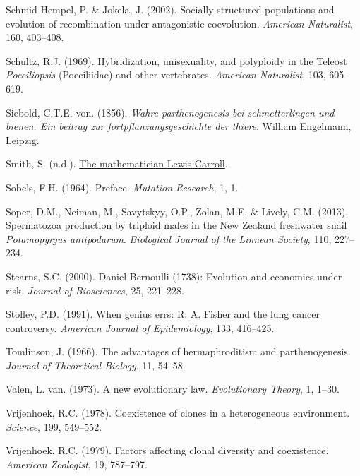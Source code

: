 \documentclass[
  letterpaper,
]{book}
\newlength{\cslhangindent}
\newenvironment{CSLReferences}[2] %
 {\begin{list}{}{%
  \setlength{\itemindent}{0pt}
  \setlength{\leftmargin}{0pt}
  \setlength{\parsep}{0pt}
  \ifodd #1
   \setlength{\leftmargin}{\cslhangindent}
   \setlength{\itemindent}{-1\cslhangindent}
  \fi
  \setlength{\itemsep}{#2\baselineskip}}}
 {\end{list}}
\begin{document}
\begin{CSLReferences}{1}{0}
Schmid-Hempel, P. \& Jokela, J. (2002). Socially structured populations
and evolution of recombination under antagonistic coevolution.
\emph{American Naturalist}, 160, 403--408.

Schultz, R.J. (1969). Hybridization, unisexuality, and polyploidy in the
{Teleost} \emph{{P}oeciliopsis} ({Poeciliidae}) and other vertebrates.
\emph{American Naturalist}, 103, 605--619.

Siebold, C.T.E. von. (1856). \emph{Wahre parthenogenesis bei
schmetterlingen und bienen. Ein beitrag zur fortpflanzungsgeschichte der
thiere}. William Engelmann, Leipzig.

Smith, S. (n.d.).
\href{http://www.herkimershideaway.org/writings/carroll.htm}{The
mathematician {Lewis Carroll}}.

Sobels, F.H. (1964). Preface. \emph{Mutation Research}, 1, 1.

Soper, D.M., Neiman, M., Savytskyy, O.P., Zolan, M.E. \& Lively, C.M.
(2013). Spermatozoa production by triploid males in the {New Zealand}
freshwater snail \emph{{P}otamopyrgus antipodarum}. \emph{Biological
Journal of the Linnean Society}, 110, 227--234.

Stearns, S.C. (2000). {Daniel Bernoulli} (1738): Evolution and economics
under risk. \emph{Journal of Biosciences}, 25, 221--228.

Stolley, P.D. (1991). When genius errs: R. A. Fisher and the lung cancer
controversy. \emph{American Journal of Epidemiology}, 133, 416--425.

Tomlinson, J. (1966). The advantages of hermaphroditism and
parthenogenesis. \emph{Journal of Theoretical Biology}, 11, 54--58.

Valen, L. van. (1973). A new evolutionary law. \emph{Evolutionary
Theory}, 1, 1--30.

Vrijenhoek, R.C. (1978). Coexistence of clones in a heterogeneous
environment. \emph{Science}, 199, 549--552.

Vrijenhoek, R.C. (1979). Factors affecting clonal diversity and
coexistence. \emph{American Zoologist}, 19, 787--797.


\end{CSLReferences}
\end{document}
